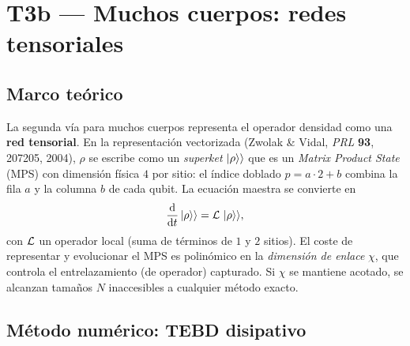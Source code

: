 \chapter{T3b --- Muchos cuerpos: redes tensoriales}
\label{ch:t3b}


\section{Marco teórico}

La segunda vía para muchos cuerpos representa el operador densidad como una
\textbf{red tensorial}. En la representación vectorizada (Zwolak \& Vidal,
\emph{PRL} \textbf{93}, 207205, 2004), $\rho$ se escribe como un \emph{superket}
$\ket{\rho}\rangle$ que es un \emph{Matrix Product State} (MPS) con dimensión
física $4$ por sitio: el índice doblado $p=a\cdot2+b$ combina la fila $a$ y la
columna $b$ de cada qubit. La ecuación maestra se convierte en
\begin{equation}
    \frac{\dd}{\dd t}\ket{\rho}\rangle = \mathcal{L}\,\ket{\rho}\rangle,
\end{equation}
con $\mathcal{L}$ un operador local (suma de términos de $1$ y $2$ sitios). El coste de
representar y evolucionar el MPS es polinómico en la \emph{dimensión de enlace}
$\chi$, que controla el entrelazamiento (de operador) capturado. Si $\chi$ se
mantiene acotado, se alcanzan tamaños $N$ inaccesibles a cualquier método exacto.

\section{Método numérico: TEBD disipativo}

